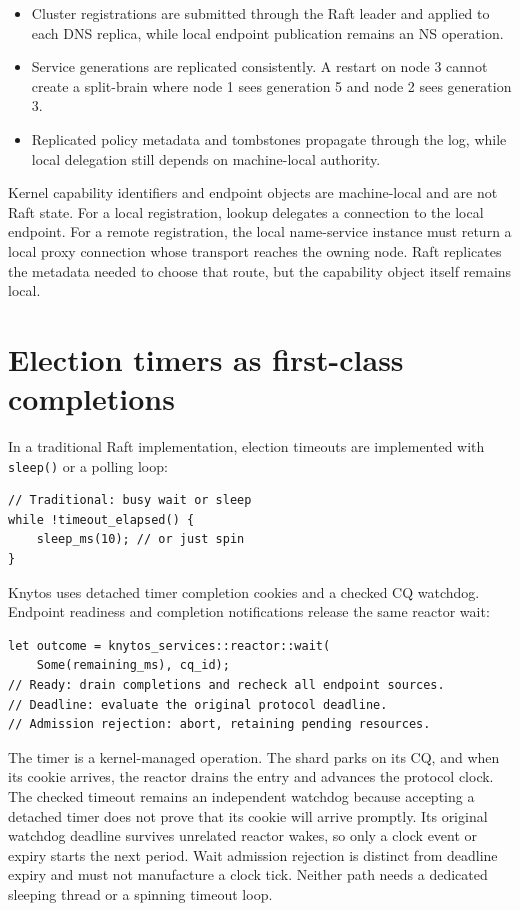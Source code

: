 \begin{itemize}
    \item Cluster registrations are submitted through the Raft leader and applied
        to each DNS replica, while local endpoint publication remains an NS operation.
    \item Service generations are replicated consistently. A restart on node 3
        cannot create a split-brain where node 1 sees generation 5 and node 2
        sees generation 3.
    \item Replicated policy metadata and tombstones propagate through the log, while
        local delegation still depends on machine-local authority.
\end{itemize}

Kernel capability identifiers and endpoint objects are machine-local and are
not Raft state. For a local registration, lookup delegates a connection to the
local endpoint. For a remote registration, the local name-service instance
must return a local proxy connection whose transport reaches the owning node.
Raft replicates the metadata needed to choose that route, but the capability
object itself remains local.

\section{Election timers as first-class completions}

In a traditional Raft implementation, election timeouts are implemented with
\texttt{sleep()} or a polling loop:

\begin{lstlisting}[style=rustCode]
// Traditional: busy wait or sleep
while !timeout_elapsed() {
    sleep_ms(10); // or just spin
}
\end{lstlisting}

Knytos uses detached timer completion cookies and a checked CQ watchdog.
Endpoint readiness and completion notifications release the same reactor wait:

\begin{lstlisting}[style=rustCode]
let outcome = knytos_services::reactor::wait(
    Some(remaining_ms), cq_id);
// Ready: drain completions and recheck all endpoint sources.
// Deadline: evaluate the original protocol deadline.
// Admission rejection: abort, retaining pending resources.
\end{lstlisting}

The timer is a kernel-managed operation. The shard parks on its CQ, and when its
cookie arrives, the reactor drains the entry and advances the protocol clock.
The checked timeout remains an independent watchdog because accepting a detached
timer does not prove that its cookie will arrive promptly. Its original watchdog
deadline survives unrelated reactor wakes, so only a clock event or expiry starts
the next period. Wait admission
rejection is distinct from deadline expiry and must not manufacture a clock tick.
Neither path needs a dedicated sleeping thread or a spinning timeout loop.

